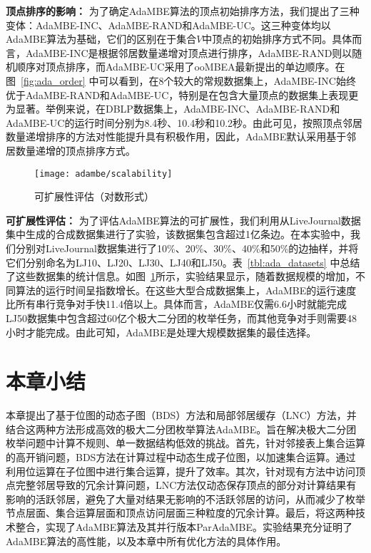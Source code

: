 \textbf{顶点排序的影响：} 为了确定AdaMBE算法的顶点初始排序方法，我们提出了三种变体：AdaMBE-INC、AdaMBE-RAND和AdaMBE-UC。这三种变体均以AdaMBE算法为基础，它们的区别在于集合$V$中顶点的初始排序方式不同。具体而言，AdaMBE-INC是根据邻居数量递增对顶点进行排序，AdaMBE-RAND则以随机顺序对顶点排序，而AdaMBE-UC采用了ooMBEA最新提出的单边顺序。在图~\ref{fig:ada_order} 中可以看到，在8个较大的常规数据集上，AdaMBE-INC始终优于AdaMBE-RAND和AdaMBE-UC，特别是在包含大量顶点的数据集上表现更为显著。举例来说，在DBLP数据集上，AdaMBE-INC、AdaMBE-RAND和AdaMBE-UC的运行时间分别为8.4秒、10.4秒和10.2秒。由此可见，按照顶点邻居数量递增排序的方法对性能提升具有积极作用，因此，AdaMBE默认采用基于邻居数量递增的顶点排序方式。

\begin{figure} [H]
	\centering
		\vspace{0.1in}
		\texttt{[image: adambe/scalability]}
	\caption{可扩展性评估（对数形式）}
	\label{fig:ada_scalability}
\end{figure}



\textbf{可扩展性评估：} 为了评估AdaMBE算法的可扩展性，我们利用从LiveJournal数据集中生成的合成数据集进行了实验，该数据集包含超过1亿条边。在本实验中，我们分别对LiveJournal数据集进行了10\%、20\%、30\%、40\%和50\%的边抽样，并将它们分别命名为LJ10、LJ20、LJ30、LJ40和LJ50。表~\ref{tbl:ada_datasets} 中总结了这些数据集的统计信息。如图~\ref{fig:ada_scalability}所示，实验结果显示，随着数据规模的增加，不同算法的运行时间呈指数增长。在这些大型合成数据集上，AdaMBE的运行速度比所有串行竞争对手快11.4倍以上。具体而言，AdaMBE仅需6.6小时就能完成LJ50数据集中包含超过60亿个极大二分团的枚举任务，而其他竞争对手则需要48小时才能完成。由此可知，AdaMBE是处理大规模数据集的最佳选择。


\section{本章小结}

本章提出了基于位图的动态子图（BDS）方法和局部邻居缓存（LNC）方法，并结合这两种方法形成高效的极大二分团枚举算法AdaMBE。旨在解决极大二分团枚举问题中计算不规则、单一数据结构低效的挑战。首先，针对邻接表上集合运算的高开销问题，BDS方法在计算过程中动态生成子位图，以加速集合运算。通过利用位运算在子位图中进行集合运算，提升了效率。其次，针对现有方法中访问顶点完整邻居导致的冗余计算问题，LNC方法仅动态保存顶点的部分对计算结果有影响的活跃邻居，避免了大量对结果无影响的不活跃邻居的访问，从而减少了枚举节点层面、集合运算层面和顶点访问层面三种粒度的冗余计算。最后，将这两种技术整合，实现了AdaMBE算法及其并行版本ParAdaMBE。实验结果充分证明了AdaMBE算法的高性能，以及本章中所有优化方法的具体作用。